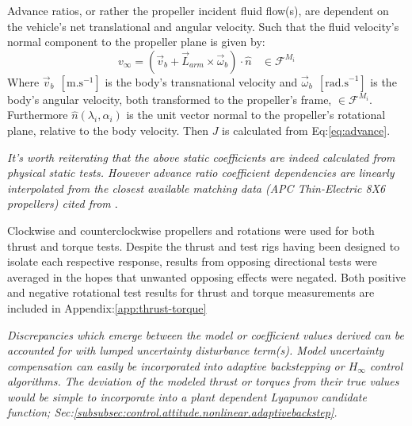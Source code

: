 Advance ratios, or rather the propeller incident fluid flow(s), are dependent on the vehicle's net translational and angular velocity. Such that the fluid velocity's normal component to the propeller plane is given by:
\begin{equation}\label{eq:normal-fluid}
v_\infty = (\vec{v}_b + \vec{L}_{arm}\times \vec{\omega}_b)\cdot \hat{n}~~~~\in\mathcal{F}^{M_i}
\end{equation}
Where $\vec{v}_b~~[\text{m.s}^{-1}]$ is the body's transnational velocity and $\vec{\omega}_b~~[\text{rad.s}^{-1}]$ is the body's angular velocity, both transformed to the propeller's frame, $\in\mathcal{F}^{M_i}$. Furthermore $\hat{n}(\lambda_i,\alpha_i)$ is the unit vector normal to the propeller's rotational plane, relative to the body velocity. Then $J$ is calculated from Eq:\ref{eq:advance}.
\par
{\color{Gray}\emph{It's worth reiterating that the above static coefficients are indeed calculated from physical static tests. However advance ratio coefficient dependencies are linearly interpolated from the closest available matching data (APC Thin-Electric 8X6 propellers) cited from \cite{UIUC}}.}
\par
Clockwise and counterclockwise propellers and rotations were used for both thrust and torque tests. Despite the thrust and test rigs having been designed to isolate each respective response, results from opposing directional tests were averaged in the hopes that unwanted opposing effects were negated. Both positive and negative rotational test results for thrust and torque measurements are included in Appendix:\ref{app:thrust-torque}
\par
{\color{Gray}\emph{Discrepancies which emerge between the model or coefficient values derived can be accounted for with lumped uncertainty disturbance term(s). Model uncertainty compensation can easily be incorporated into adaptive backstepping or $H_\infty$ control algorithms. The deviation of the modeled thrust or torques from their true values would be simple to incorporate into a plant dependent Lyapunov candidate function; Sec:\ref{subsubsec:control.attitude.nonlinear.adaptivebackstep}.}}
